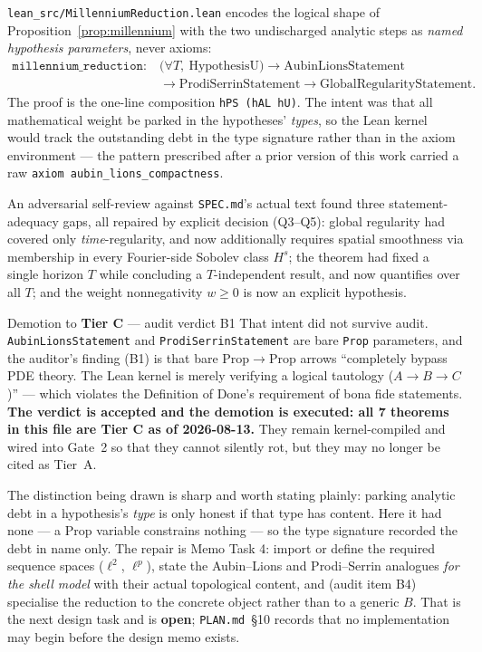 \documentclass[11pt,a4paper]{article}
\newcommand{\tC}{\textcolor{TierC}{\textbf{Tier C}}}
\theoremstyle{definition}
\theoremstyle{plain}
\begin{document}
\texttt{lean\_src/MillenniumReduction.lean} encodes the logical shape of Proposition~\ref{prop:millennium} with
the two undischarged analytic steps as \emph{named hypothesis parameters}, never axioms:
\[
\begin{aligned}
\texttt{millennium\_reduction} :\ &\bigl(\forall T,\ \mathrm{HypothesisU}\bigr)\to
\mathrm{AubinLionsStatement}\\
&\to \mathrm{ProdiSerrinStatement}\to
\mathrm{GlobalRegularityStatement}.
\end{aligned}
\]
The proof is the one-line composition \texttt{hPS (hAL hU)}. The intent was that all
mathematical weight be parked in the hypotheses' \emph{types}, so the Lean kernel would track
the outstanding debt in the type signature rather than in the axiom environment --- the pattern
prescribed after a prior version of this work carried a raw \texttt{axiom
aubin\_lions\_compactness}.

An adversarial self-review against \texttt{SPEC.md}'s actual text found three
statement-adequacy gaps, all repaired by explicit decision (Q3--Q5): global regularity had
covered only \emph{time}-regularity, and now additionally requires spatial smoothness via
membership in every Fourier-side Sobolev class $H^s$; the theorem had fixed a single horizon
$T$ while concluding a $T$-independent result, and now quantifies over all $T$; and the weight
nonnegativity $w\ge0$ is now an explicit hypothesis.

\begin{warnbox}{Demotion to \tC{} --- audit verdict B1}
That intent did not survive audit. \texttt{AubinLionsStatement} and
\texttt{ProdiSerrinStatement} are bare \texttt{Prop} parameters, and the auditor's finding
(B1) is that bare $\mathrm{Prop}\to\mathrm{Prop}$ arrows ``completely bypass PDE theory. The
Lean kernel is merely verifying a logical tautology ($A\to B\to C$)'' --- which violates the
Definition of Done's requirement of bona fide statements. \textbf{The verdict is accepted and
the demotion is executed: all 7 theorems in this file are \tC{} as of 2026-08-13.} They remain
kernel-compiled and wired into Gate~2 so that they cannot silently rot, but they may no longer
be cited as Tier~A.

The distinction being drawn is sharp and worth stating plainly: parking analytic debt in a
hypothesis's \emph{type} is only honest if that type has content. Here it had none --- a
$\mathrm{Prop}$ variable constrains nothing --- so the type signature recorded the debt in name
only. The repair is Memo Task 4: import or define the required sequence spaces ($\ell^2$,
$\ell^p$), state the Aubin--Lions and Prodi--Serrin analogues \emph{for the shell model} with
their actual topological content, and (audit item B4) specialise the reduction to the concrete
object rather than to a generic $B$. That is the next design task and is \textbf{open};
\texttt{PLAN.md}~\S10 records that no implementation may begin before the design memo exists.
\end{warnbox}
\end{document}
